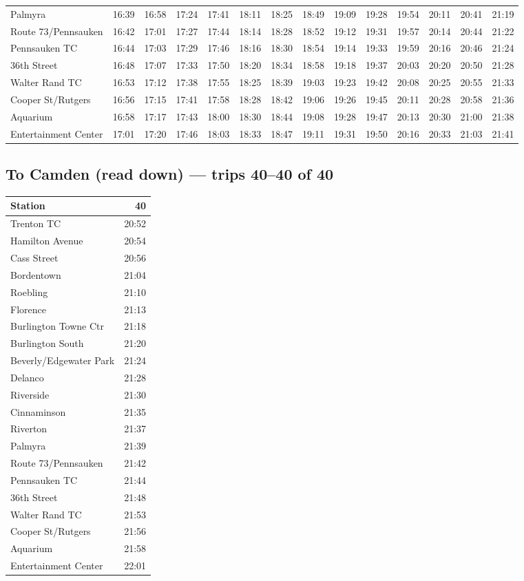 \begin{center}
\begin{tabular}{@{}lrrrrrrrrrrrrr@{}}
Palmyra & 16:39 & 16:58 & 17:24 & 17:41 & 18:11 & 18:25 & 18:49 & 19:09 & 19:28 & 19:54 & 20:11 & 20:41 & 21:19 \\
Route 73/Pennsauken & 16:42 & 17:01 & 17:27 & 17:44 & 18:14 & 18:28 & 18:52 & 19:12 & 19:31 & 19:57 & 20:14 & 20:44 & 21:22 \\
Pennsauken TC & 16:44 & 17:03 & 17:29 & 17:46 & 18:16 & 18:30 & 18:54 & 19:14 & 19:33 & 19:59 & 20:16 & 20:46 & 21:24 \\
36th Street & 16:48 & 17:07 & 17:33 & 17:50 & 18:20 & 18:34 & 18:58 & 19:18 & 19:37 & 20:03 & 20:20 & 20:50 & 21:28 \\
Walter Rand TC & 16:53 & 17:12 & 17:38 & 17:55 & 18:25 & 18:39 & 19:03 & 19:23 & 19:42 & 20:08 & 20:25 & 20:55 & 21:33 \\
Cooper St/Rutgers & 16:56 & 17:15 & 17:41 & 17:58 & 18:28 & 18:42 & 19:06 & 19:26 & 19:45 & 20:11 & 20:28 & 20:58 & 21:36 \\
Aquarium & 16:58 & 17:17 & 17:43 & 18:00 & 18:30 & 18:44 & 19:08 & 19:28 & 19:47 & 20:13 & 20:30 & 21:00 & 21:38 \\
Entertainment Center & 17:01 & 17:20 & 17:46 & 18:03 & 18:33 & 18:47 & 19:11 & 19:31 & 19:50 & 20:16 & 20:33 & 21:03 & 21:41 \\
\bottomrule\end{tabular}\end{center}
\subsection*{To Camden (read down) --- trips 40--40 of 40}
\begin{center}\footnotesize\setlength{\tabcolsep}{3pt}\begin{tabular}{@{}lr@{}}\toprule
Station & 40 \\\midrule
Trenton TC & 20:52 \\
Hamilton Avenue & 20:54 \\
Cass Street & 20:56 \\
Bordentown & 21:04 \\
Roebling & 21:10 \\
Florence & 21:13 \\
Burlington Towne Ctr & 21:18 \\
Burlington South & 21:20 \\
Beverly/Edgewater Park & 21:24 \\
Delanco & 21:28 \\
Riverside & 21:30 \\
Cinnaminson & 21:35 \\
Riverton & 21:37 \\
Palmyra & 21:39 \\
Route 73/Pennsauken & 21:42 \\
Pennsauken TC & 21:44 \\
36th Street & 21:48 \\
Walter Rand TC & 21:53 \\
Cooper St/Rutgers & 21:56 \\
Aquarium & 21:58 \\
Entertainment Center & 22:01 \\
\bottomrule\end{tabular}\end{center}
\clearpage
